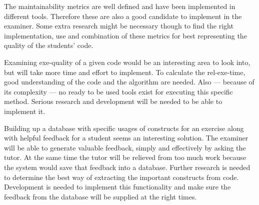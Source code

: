 The maintainability metrics are well defined
and have been implemented in different tools.
Therefore these are also a good candidate to implement in the \gls{examiner}.
Some extra research might be necessary though
to find the right implementation, use and combination of these metrics
for best representing the quality of the \glspl{student}' \gls{code}.

Examining \gls{exe-quality} of a given \gls{code}
would be an interesting area to look into,
but will take more time and effort to implement.
To calculate the \gls{rel-exe-time},
good understanding of the \gls{code} and the algorithm are needed.
Also --- because of its complexity --- no ready to be used tools exist
for executing this specific method.
Serious research and development will be needed to be able to implement it.

Building up a database with specific usages of \glspl{construct}
for an \gls{exercise} along with helpful \gls{feedback} for a \gls{student}
seems an interesting solution.
The \gls{examiner} will be able to generate valuable \gls{feedback},
simply and effectively by asking the \gls{tutor}.
At the same time the \gls{tutor} will be relieved from too much work
because the system would save that \gls{feedback} into a database.
Further research is needed to determine the best way of
extracting the important \glspl{construct} from \gls{code}.
Development is needed to implement this functionality
and make sure the \gls{feedback} from the database
will be supplied at the right times.

